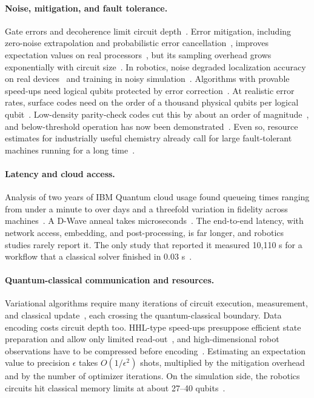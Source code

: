 \documentclass[acmsmall,screen,review]{acmart}
\begin{document}
\paragraph{Noise, mitigation, and fault tolerance.} Gate errors and decoherence limit circuit depth~\cite{Preskill2018}. Error mitigation, including zero-noise extrapolation and probabilistic error cancellation~\cite{Temme2017}, improves expectation values on real processors~\cite{Kandala2019}, but its sampling overhead grows exponentially with circuit size~\cite{Cai2023}. In robotics, noise degraded localization accuracy on real devices~\cite{Antero2025} and training in noisy simulation~\cite{Sinha2023}. Algorithms with provable speed-ups need logical qubits protected by error correction~\cite{Terhal2015}. At realistic error rates, surface codes need on the order of a thousand physical qubits per logical qubit~\cite{Fowler2012}. Low-density parity-check codes cut this by about an order of magnitude~\cite{Bravyi2024}, and below-threshold operation has now been demonstrated~\cite{GoogleQAI2025}. Even so, resource estimates for industrially useful chemistry already call for large fault-tolerant machines running for a long time~\cite{Reiher2017,Kim2022}.

\paragraph{Latency and cloud access.} Analysis of two years of IBM Quantum cloud usage found queueing times ranging from under a minute to over days and a threefold variation in fidelity across machines~\cite{Ravi2021}. A D-Wave anneal takes microseconds~\cite{Ohzeki2019}. The end-to-end latency, with network access, embedding, and post-processing, is far longer, and robotics studies rarely report it. The only study that reported it measured 10,110 s for a workflow that a classical solver finished in 0.03 s~\cite{Willmann2025}.

\paragraph{Quantum-classical communication and resources.} Variational algorithms require many iterations of circuit execution, measurement, and classical update~\cite{McClean2016}, each crossing the quantum-classical boundary. Data encoding costs circuit depth too. HHL-type speed-ups presuppose efficient state preparation and allow only limited read-out~\cite{Harrow2009,Aaronson2015}, and high-dimensional robot observations have to be compressed before encoding~\cite{Chen2022}. Estimating an expectation value to precision $\epsilon$ takes $O(1/\epsilon^2)$ shots, multiplied by the mitigation overhead~\cite{Cai2023} and by the number of optimizer iterations. On the simulation side, the robotics circuits hit classical memory limits at about 27--40 qubits~\cite{Chella2022,Antero2025}.
\end{document}
